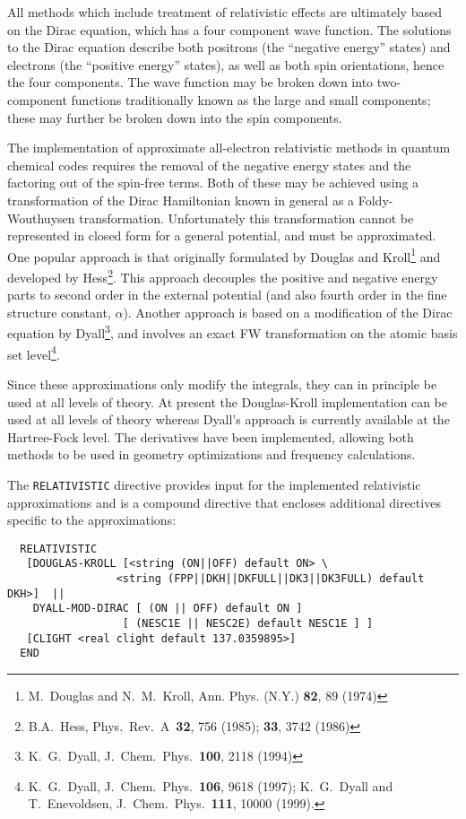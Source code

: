 %
%
\label{sec:rel}
All methods which include treatment of relativistic effects are ultimately
based on the Dirac equation, which has a four component wave function. The
solutions to the Dirac equation describe both positrons (the ``negative
energy'' states) and electrons (the ``positive energy'' states), as well as
both spin orientations, hence the four components. The wave function may be
broken down into two-component functions traditionally known as the large
and small components; these may further be broken down into the spin
components. 

The implementation of approximate all-electron relativistic methods in
quantum chemical codes requires the removal of the negative energy states
and the factoring out of the spin-free terms. Both of these may be achieved
using a transformation of the Dirac Hamiltonian known in general as a
Foldy-Wouthuysen transformation. Unfortunately this transformation cannot be
represented in closed form for a general potential, and must be
approximated.  One popular approach is that originally formulated by Douglas
and Kroll\footnote{M.~Douglas and N.~M.~Kroll, Ann. Phys. (N.Y.)  {\bf 82},
89 (1974)} and developed by Hess\footnote{B.A.~Hess, Phys.~Rev.~A~{\bf 32},
756 (1985); {\bf 33}, 3742 (1986)}. This approach decouples the positive and
negative energy parts to second order in the external potential (and also
fourth order in the fine structure constant, $\alpha$). Another approach is
based on a modification of the Dirac equation by Dyall\footnote{K.~G.~Dyall,
J.~Chem.~Phys.~{\bf 100}, 2118 (1994)}, and involves an exact FW
transformation on the atomic basis set level\footnote{K.~G.~Dyall,
J.~Chem.~Phys.~{\bf 106}, 9618 (1997); K.~G.~Dyall and T.~Enevoldsen,
J.~Chem.~Phys.~{\bf 111}, 10000 (1999).}.

Since these approximations only modify the integrals, they can in principle
be used at all levels of theory. At present the Douglas-Kroll implementation
can be used at all levels of theory whereas Dyall's approach is currently
available at the Hartree-Fock level. 
The derivatives have been implemented, allowing both methods to be used in 
geometry optimizations and frequency calculations.

The \verb+RELATIVISTIC+ directive provides input for the implemented relativistic 
approximations and is a compound directive that encloses additional directives 
specific to the approximations:
\begin{verbatim}
  RELATIVISTIC
   [DOUGLAS-KROLL [<string (ON||OFF) default ON> \
                 <string (FPP||DKH||DKFULL||DK3||DK3FULL) default DKH>]  ||
    DYALL-MOD-DIRAC [ (ON || OFF) default ON ] 
                  [ (NESC1E || NESC2E) default NESC1E ] ]
   [CLIGHT <real clight default 137.0359895>]
  END
\end{verbatim}

